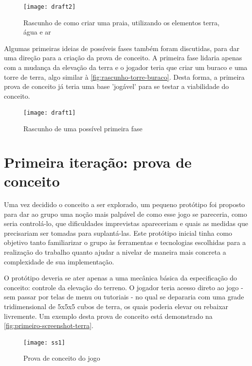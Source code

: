 \begin{figure}[htb]
	\centering
	\caption{Rascunho de como criar uma praia, utilizando os elementos terra, água e ar}
	\texttt{[image: draft2]}
	\legend{\fonteAP}
	\label{fig:rascunhos-praia}
\end{figure}

Algumas primeiras ideias de possíveis fases também foram discutidas, para 
dar uma direção para a criação da prova de conceito. A primeira fase lidaria 
apenas com a mudança da elevação da terra e o jogador teria que criar um 
buraco e uma torre de terra, algo similar à \autoref{fig:rascunho-torre-buraco}.
Desta forma, a primeira prova de conceito já teria uma base 'jogável' 
para se testar a viabilidade do conceito.

\begin{figure}[h]
	\centering
	\caption{Rascunho de uma possível primeira fase}
	\texttt{[image: draft1]}
	\legend{\fonteAP}
	\label{fig:rascunho-torre-buraco}
\end{figure}

\section{Primeira iteração: prova de conceito}\label{sec-primeira-iteracao-prova-conceito}

Uma vez decidido o conceito a ser explorado, um pequeno protótipo foi proposto 
para dar ao grupo uma noção mais palpável de como esse jogo se pareceria, como 
seria controlá-lo, que dificuldades imprevistas apareceriam e quais as medidas 
que precisariam ser tomadas para suplantá-las. Este protótipo inicial tinha 
como objetivo tanto familiarizar o grupo às ferramentas e tecnologias 
escolhidas para a realização do trabalho quanto ajudar a nivelar de maneira 
mais concreta a complexidade de sua implementação.

O protótipo deveria se ater apenas a uma mecânica básica da especificação 
do conceito: controle da elevação do terreno. O jogador teria acesso direto ao 
jogo - sem passar por telas de menu ou tutoriais - no qual se depararia com 
uma grade tridimensional de 5x5x5 cubos de terra, os quais poderia elevar 
ou rebaixar livremente. Um exemplo desta prova de conceito está demonstrado na \autoref{fig:primeiro-screenshot-terra}.

\begin{figure}[h]
	\centering
	\caption{Prova de conceito do jogo}
	\texttt{[image: ss1]}
	\legend{\fonteAP}
	\label{fig:primeiro-screenshot-terra}
\end{figure}

